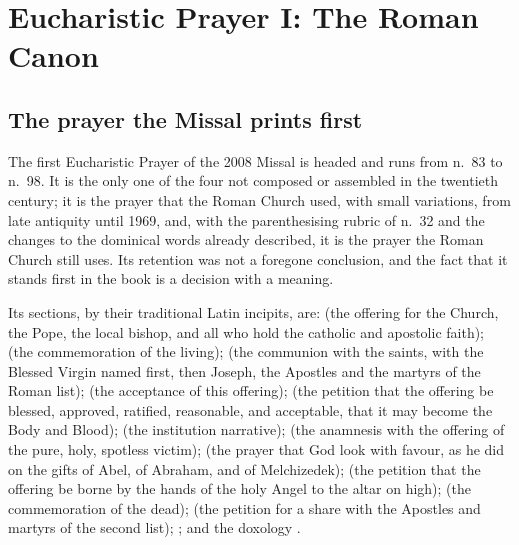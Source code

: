 \section{Eucharistic Prayer I: The Roman Canon}

\subsection{The prayer the Missal prints first}

The first Eucharistic Prayer of the 2008 Missal is headed  and runs from n.\ 83 to n.\ 98. It is the only one of the four not composed or
assembled in the twentieth century; it is the prayer that the Roman Church used, with small
variations, from late antiquity until 1969, and, with the parenthesising rubric of n.\ 32 and
the changes to the dominical words already described, it is the prayer the Roman Church still
uses. Its retention was not a foregone conclusion, and the fact that it stands first in the
book is a decision with a meaning.

Its sections, by their traditional Latin incipits, are:  (the offering for the
Church, the Pope, the local bishop, and all who hold the catholic and apostolic faith);
 (the commemoration of the living);  (the communion
with the saints, with the Blessed Virgin named first, then Joseph, the Apostles and the martyrs
of the Roman list);  (the acceptance of this offering);  (the petition that the offering be blessed, approved, ratified, reasonable, and
acceptable, that it may become the Body and Blood);  (the institution
narrative);  (the anamnesis with the offering of the pure, holy, spotless
victim);  (the prayer that God look with favour, as he did on the gifts of
Abel, of Abraham, and of Melchizedek);  (the petition that the
offering be borne by the hands of the holy Angel to the altar on high); 
(the commemoration of the dead);  (the petition for a share
with the Apostles and martyrs of the second list); ; and the doxology
.

